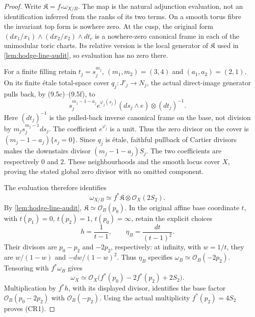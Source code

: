 \begin{proof}
Write $\mathfrak K=f_*\omega_{X/B}$. The map is the natural adjunction
evaluation, not an identification inferred from the ranks of its two
terms. On a smooth torus fibre the invariant top form is nowhere zero.
At the cusp, the original form
$(dx_1/x_1)\wedge(dx_2/x_2)\wedge dt_c$ is a nowhere-zero canonical
frame in each of the unimodular toric charts. Its relative version is
the local generator of $\mathfrak K$ used in
\cref{lem:hodge-line-audit}, so evaluation has no zero there.

For a finite filling retain $t_j=s_j^{m_j}$,
$(m_1,m_2)=(3,4)$ and $(a_1,a_2)=(2,1)$. On its finite \'etale
total-space cover $q_j:J'_j\to N_j$, the actual direct-image generator
pulls back, by (9.5c)--(9.5f), to
\[
 s_j^{m_j-1-a_j}e^{\varphi_j(s_j)}
       (ds_j\wedge e)\otimes(dt_j)^{-1}.
 \tag{CR5}
\]
Here $(dt_j)^{-1}$ is the pulled-back inverse canonical frame on the
base, not division by $m_js_j^{m_j-1}ds_j$. The coefficient
$e^{\varphi_j}$ is a unit. Thus the zero divisor on the cover is
$(m_j-1-a_j)\{s_j=0\}$. Since $q_j$ is \'etale, faithful pullback
of Cartier divisors makes the downstairs divisor
$(m_j-1-a_j)S_j$. The two coefficients are respectively $0$ and $2$.
These neighbourhoods and the smooth locus cover $X$, proving the stated
global zero divisor with no omitted component.

The evaluation therefore identifies
\[
 \omega_{X/B}\simeq f^*\mathfrak K\otimes\mathcal O_X(2S_2).
\]
By \cref{lem:hodge-line-audit}, $\mathfrak K\simeq\mathcal O_B(p_0)$.
In the original affine base coordinate $t$, with
$t(p_1)=0$, $t(p_2)=1$, $t(p_0)=\infty$, retain the explicit choices
\[
 h=\frac1{t-1},\qquad \eta_B=\frac{dt}{(t-1)^2}.
\]
Their divisors are $p_0-p_2$ and $-2p_2$, respectively: at infinity,
with $w=1/t$, they are $w/(1-w)$ and $-dw/(1-w)^2$.
Thus $\eta_B$ specifies $\omega_B\simeq\mathcal O_B(-2p_2)$.
Tensoring with $f^*\omega_B$ gives
\[
 \omega_X\simeq
 \mathcal O_X\bigl(f^*(p_0)-2f^*(p_2)+2S_2\bigr).
\]
Multiplication by $f^*h$, with its displayed divisor, identifies the
base factor $\mathcal O_B(p_0-2p_2)$ with $\mathcal O_B(-p_2)$.
Using the actual multiplicity $f^*(p_2)=4S_2$ proves (CR1).


\end{proof}

